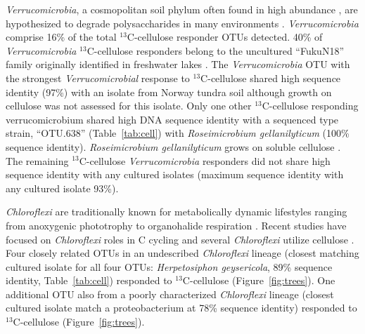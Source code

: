 \textit{Verrucomicrobia}, a cosmopolitan soil phylum often found in high
abundance \citep{Fierer_2013}, are hypothesized to degrade polysaccharides in
many environments \citep{Fierer_2013,Herlemann_2013,10543821}.
\textit{Verrucomicrobia} comprise 16\% of the total $^{13}$C-cellulose
responder OTUs detected. 40\% of \textit{Verrucomicrobia} $^{13}$C-cellulose
responders belong to the uncultured ``FukuN18'' family originally identified in
freshwater lakes \citep{Parveen_2013}.  The \textit{Verrucomicrobia} OTU with
the strongest \textit{Verrucomicrobial} response to $^{13}$C-cellulose shared
high sequence identity (97\%) with an isolate from Norway tundra soil
\citep{Jiang_2011} although growth on cellulose was not assessed for this
isolate. Only one other $^{13}$C-cellulose responding verrucomicrobium shared
high DNA sequence identity with a sequenced type strain, ``OTU.638''
(Table~\ref{tab:cell}) with \textit{Roseimicrobium gellanilyticum} (100\%
sequence identity).  \textit{Roseimicrobium gellanilyticum} grows on soluble
cellulose \citep{Otsuka_2012}. The remaining $^{13}$C-cellulose
\textit{Verrucomicrobia} responders did not share high sequence identity with
any cultured isolates (maximum sequence identity with any cultured isolate
93\%).

\textit{Chloroflexi} are traditionally known for metabolically dynamic
lifestyles ranging from anoxygenic phototrophy to organohalide respiration
\citep{Hug_2013}. Recent studies have focused on \textit{Chloroflexi} roles in
C cycling \citep{Hug_2013, Goldfarb_2011,Cole_2013} and several
\textit{Chloroflexi} utilize cellulose \citep{Goldfarb_2011, Cole_2013,
Hug_2013}. Four closely related OTUs in an undescribed \textit{Chloroflexi}
lineage (closest matching cultured isolate for all four OTUs:
\textit{Herpetosiphon geysericola}, 89\% sequence identity,
Table~\ref{tab:cell}) responded to $^{13}$C-cellulose (Figure~\ref{fig:trees}).
One additional OTU also from a poorly characterized \textit{Chloroflexi}
lineage (closest cultured isolate match a proteobacterium at 78\% sequence
identity) responded to $^{13}$C-cellulose (Figure~\ref{fig:trees}).

